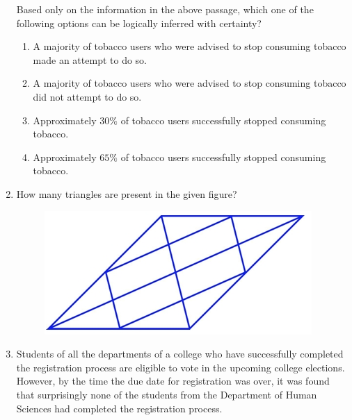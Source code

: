 \documentclass[journal,12pt,onecolumn]{IEEEtran}
\theoremstyle{remark}
\begin{document}
\begin{enumerate}
Based only on the information in the above passage, which one of the following options can be logically inferred with certainty?
\begin{enumerate}
\item A majority of tobacco users who were advised to stop consuming tobacco made an attempt to do so.
\item A majority of tobacco users who were advised to stop consuming tobacco did not attempt to do so.
\item Approximately $30\%$ of tobacco users successfully stopped consuming tobacco.
\item Approximately $65\%$ of tobacco users successfully stopped consuming tobacco.
\end{enumerate}
\hfill{}

\newpage

    

\item How many triangles are present in the given figure? \\
\begin{figure}[h]
    \centering
    \includegraphics[width=0.5\columnwidth]{figs/img 1.jpeg}
    \caption{}
    \label{fig:placeholder}
\end{figure}


\begin{enumerate}
\end{enumerate}
\hfill{}
\item Students of all the departments of a college who have successfully completed the registration process are eligible to vote in the upcoming college elections. However, by the time the due date for registration was over, it was found that surprisingly none of the students from the Department of Human Sciences had completed the registration process. \\


\end{enumerate}
\end{document}
